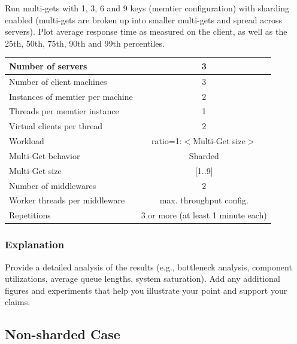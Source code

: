 \documentclass[11pt,a4paper]{article}
\begin{document}
Run multi-gets with 1, 3, 6 and 9 keys (memtier configuration) with sharding enabled (multi-gets are broken up into smaller multi-gets and spread across servers). Plot average response time as measured on the client, as well as the 25th, 50th, 75th, 90th and 99th percentiles.

\begin{center}
	\scriptsize{
		\begin{tabular}{|l|c|}
			\hline Number of servers                & 3                       \\ 
			\hline Number of client machines        & 3                       \\ 
			\hline Instances of memtier per machine & 2                       \\ 
			\hline Threads per memtier instance     & 1                       \\
			\hline Virtual clients per thread       & 2     		            \\ 
			\hline Workload                         & ratio=1:$<$Multi-Get size$>$             \\
			\hline Multi-Get behavior               & Sharded                 \\
			\hline Multi-Get size                   & [1..9]                  \\
			\hline Number of middlewares            & 2                       \\
			\hline Worker threads per middleware    & max. throughput config. \\
			\hline Repetitions                      & 3 or more (at least 1 minute each)               \\ 
			\hline 
		\end{tabular}
	} 
\end{center}

\subsubsection{Explanation}

Provide a detailed analysis of the results (e.g., bottleneck analysis, component utilizations, average queue lengths, system saturation). Add any additional figures and experiments that help you illustrate your point and support your claims.

\subsection{Non-sharded Case}
\end{document}
